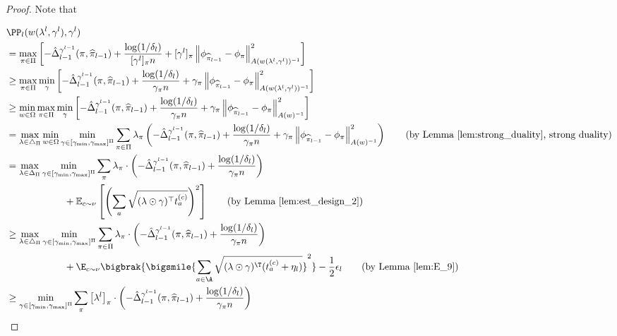 \documentclass{article}
\newcommand{\pill}{\widehat{\pi}_{l-1}}
\newcommand{\1}{\mathbf{1}}
\begin{document}
\begin{proof} Note that

\begingroup
\allowdisplaybreaks
\begin{align*}
    &\PP_{l}(w(\lambda^{l},\gamma^l),\gamma^l)\\
    &=\max _{\pi\in\Pi}\left[-\hat{\Delta}_{l-1}^{\gamma^{l-1}}(\pi,\pill)+\frac{\log(1 / \delta_l)}{[\gamma^l]_{\pi} n}+[\gamma^l]_{\pi}\left\|\phi_{\pill}-\phi_{\pi}\right\|_{A(w(\lambda^{l},\gamma^l))^{-1}}^{2}\right]\\
    &\geq \max_{\pi\in\Pi}\min_{\gamma}\left[-\hat{\Delta}_{l-1}^{\gamma^{l-1}}(\pi,\pill)+\frac{\log(1 / \delta_l)}{\gamma_{\pi} n}+\gamma_{\pi}\left\|\phi_{\pill}-\phi_{\pi}\right\|_{A(w(\lambda^{l},\gamma^{l}))^{-1}}^{2}\right]\\
    &\geq \min_{w\in\Omega}\max_{\pi\in\Pi}\min_{\gamma}\left[-\hat{\Delta}_{l-1}^{\gamma^{l-1}}(\pi,\pill)+\frac{\log(1 / \delta_l)}{\gamma_{\pi} n}+\gamma_{\pi}\left\|\phi_{\pill}-\phi_{\pi}\right\|_{A(w)^{-1}}^{2}\right]\\
    &= \max_{\lambda\in\triangle_\Pi}\min_{w\in\Omega}\min_{\gamma\in[\gamma_{\min},\gamma_{\max}]^{\Pi}}\sum_{\pi\in\Pi}\lambda_{\pi}\left(-\hat{\Delta}_{l-1}^{\gamma^{l-1}}(\pi,\pill)+\frac{\log(1 / \delta_l)}{\gamma_{\pi} n}+\gamma_{\pi}\left\|\phi_{\pill}-\phi_{\pi}\right\|_{A(w)^{-1}}^{2}\right)\tag{by Lemma~\ref{lem:strong_duality}, strong duality}\\
    &=\max _{\lambda\in \Delta_{\Pi}} \min _{\gamma\in [\gamma_{\min},\gamma_{\max}]^{\Pi}} \sum_{\pi} \lambda_{\pi} \cdot\left(-\hat{\Delta}_{l-1}^{\gamma^{l-1}}(\pi,\pill)+\frac{\log (1 / \delta_l)}{\gamma_{\pi} n}\right)\\
    &\qquad\qquad\qquad+\mathbb{E}_{c\sim\nu}\left[\left(\sum_{a} \sqrt{(\lambda\odot\gamma)^{\top} t_{a}^{(c)}}\right)^{2}\right]\tag{by Lemma~\ref{lem:est_design_2}}\\
    &\geq\max_{\lambda\in\triangle_\Pi}\min_{\gamma\in [\gamma_{\min},\gamma_{\max}]^{\Pi}} \sum_{\pi\in\Pi}\lambda_\pi\cdot\left(-\hat{\Delta}_{l-1}^{\gamma^{l-1}}(\pi,\pill)+\frac{\log(1/\delta_l)}{\gamma_\pi n}\right)\\
    &\qquad\qquad\qquad+\E_{c\sim\nu}\bigbrak{\bigsmile{\sum_{a\in\A}\sqrt{(\lambda\odot \gamma)^\T (t_a^{(c)}+\eta_l)}}^2}-\frac{1}{2}\epsilon_l\tag{by Lemma~\ref{lem:E_9}}\\
    &\geq \min _{\gamma \in [\gamma_{\min},\gamma_{\max}]^{\Pi}} \sum_{\pi}\left[\lambda^{l}\right]_{\pi} \cdot\left(-\hat{\Delta}_{l-1}^{\gamma^{l-1}}(\pi,\pill)+\frac{\log(1 / \delta_l)}{\gamma_{\pi} n}\right)\\

\end{align*}
\end{proof}
\end{document}
